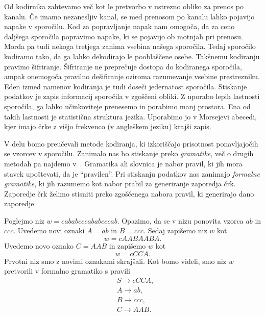 \documentclass[fin1, tisk]{fmfdelo}
\theoremstyle{definition}
\begin{document}
Od kodirnika zahtevamo več kot le pretvorbo v ustrezno obliko za prenos po kanalu.
Če imamo nezanesljiv kanal, se med prenosom po kanalu lahko pojavijo napake v sporočilu.
Kod za popravljanje napak nam omogoča, da za ceno daljšega sporočila popravimo napake, ki se 
pojavijo ob motnjah pri prenosu. %
Morda pa tudi nekoga tretjega zanima vsebina našega sporočila. Tedaj sporočilo kodiramo
tako, da ga lahko dekodirajo le pooblaščene osebe. Takšnemu kodiranju pravimo
šifriranje. Šifriranje ne preprečuje dostopa do kodiranega sporočila, ampak onemogoča pravilno
dešifiranje oziroma razumevanje vsebine prestrezniku. %
Eden izmed namenov kodiranja je tudi doseči jedernatost sporočila. Stiskanje podatkov 
je zapis informacij sporočila v zgoščeni obliki. Z uporabo lepih lastnosti sporočila, ga lahko
učinkoviteje prenesemo in porabimo manj prostora. Ena od takih lastnosti je statistična struktura
jezika. Uporabimo jo v Morsejevi abecedi, kjer imajo črke z višjo frekvenco (v angleškem jeziku) 
krajši zapis. %

V delu bomo preučevali metode kodiranja, ki izkoriščajo prisotnost ponavljajočih se vzorcev
v sporočilu. Zanimalo nas bo stiskanje preko \emph{gramatike}, več o drugih metodah pa najdemo 
v~\cite{Sayood2017}. Gramatika ali slovnica je nabor pravil, ki jih mora stavek 
upoštevati, da je ``pravilen''. Pri stiskanju podatkov nas zanimajo \emph{formalne gramatike}, 
ki jih razumemo kot nabor prabil za generiranje zaporedja črk. Zaporedje črk želimo 
stisniti preko zgoščenega nabora pravil, ki generirajo dano zaporedje.

\begin{primer}
    \label{primer:motivacija}
    Poglejmo niz $w =\mathit{cababcccababcccab}$.
    Opazimo, da se v nizu ponovita vzorca $\mathit{ab}$ in $\mathit{ccc}$. Uvedemo novi oznaki
    $A = \mathit{ab}$ in $B = \mathit{ccc}$. Sedaj zapišemo niz $w$ kot
    \[
        w = \mathit{cAABAABA}.
    \]
    Uvedemo novo oznako $C = \mathit{AAB}$
    in zapišemo $w$ kot
    \[
        w = \mathit{cCCA}.
    \]
    Prvotni niz smo z novimi oznakami skrajšali. Kot bomo videli, smo niz $w$ pretvorili v 
    formalno gramatiko s pravili
    \begin{align*}
        & S  \rightarrow \mathit{cCCA}, \\
        & A  \rightarrow \mathit{ab}, \\
        & B  \rightarrow \mathit{ccc}, \\
        & C  \rightarrow \mathit{AAB}.
    \end{align*}
\end{primer}
\end{document}
